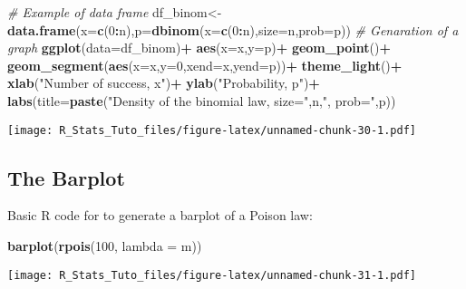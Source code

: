 \documentclass[
]{article}
\newenvironment{Shaded}{\begin{snugshade}}{\end{snugshade}}
\newcommand{\AttributeTok}[1]{\textcolor[rgb]{0.13,0.29,0.53}{#1}}
\newcommand{\CommentTok}[1]{\textcolor[rgb]{0.56,0.35,0.01}{\textit{#1}}}
\newcommand{\DecValTok}[1]{\textcolor[rgb]{0.00,0.00,0.81}{#1}}
\newcommand{\FunctionTok}[1]{\textcolor[rgb]{0.13,0.29,0.53}{\textbf{#1}}}
\newcommand{\NormalTok}[1]{#1}
\newcommand{\OtherTok}[1]{\textcolor[rgb]{0.56,0.35,0.01}{#1}}
\newcommand{\SpecialCharTok}[1]{\textcolor[rgb]{0.81,0.36,0.00}{\textbf{#1}}}
\newcommand{\StringTok}[1]{\textcolor[rgb]{0.31,0.60,0.02}{#1}}
\begin{document}
\begin{Shaded}
\begin{Highlighting}[]
\CommentTok{\# Example of data frame}
\NormalTok{df\_binom}\OtherTok{\textless{}{-}}\FunctionTok{data.frame}\NormalTok{(}\AttributeTok{x=}\FunctionTok{c}\NormalTok{(}\DecValTok{0}\SpecialCharTok{:}\NormalTok{n),}\AttributeTok{p=}\FunctionTok{dbinom}\NormalTok{(}\AttributeTok{x=}\FunctionTok{c}\NormalTok{(}\DecValTok{0}\SpecialCharTok{:}\NormalTok{n),}\AttributeTok{size=}\NormalTok{n,}\AttributeTok{prob=}\NormalTok{p))}
\CommentTok{\# Genaration of a graph}
\FunctionTok{ggplot}\NormalTok{(}\AttributeTok{data=}\NormalTok{df\_binom)}\SpecialCharTok{+}
  \FunctionTok{aes}\NormalTok{(}\AttributeTok{x=}\NormalTok{x,}\AttributeTok{y=}\NormalTok{p)}\SpecialCharTok{+}
  \FunctionTok{geom\_point}\NormalTok{()}\SpecialCharTok{+}
  \FunctionTok{geom\_segment}\NormalTok{(}\FunctionTok{aes}\NormalTok{(}\AttributeTok{x=}\NormalTok{x,}\AttributeTok{y=}\DecValTok{0}\NormalTok{,}\AttributeTok{xend=}\NormalTok{x,}\AttributeTok{yend=}\NormalTok{p))}\SpecialCharTok{+}
  \FunctionTok{theme\_light}\NormalTok{()}\SpecialCharTok{+}
  \FunctionTok{xlab}\NormalTok{(}\StringTok{"Number of success, x"}\NormalTok{)}\SpecialCharTok{+}
  \FunctionTok{ylab}\NormalTok{(}\StringTok{"Probability, p"}\NormalTok{)}\SpecialCharTok{+}
  \FunctionTok{labs}\NormalTok{(}\AttributeTok{title=}\FunctionTok{paste}\NormalTok{(}\StringTok{"Density of the binomial law, size="}\NormalTok{,n,}\StringTok{", prob="}\NormalTok{,p))}
\end{Highlighting}
\end{Shaded}

\texttt{[image: R\_Stats\_Tuto\_files/figure-latex/unnamed-chunk-30-1.pdf]}

\hypertarget{the-barplot}{%
\subsection{The Barplot}\label{the-barplot}}

Basic R code for to generate a barplot of a Poison law:

\begin{Shaded}
\begin{Highlighting}[]
\FunctionTok{barplot}\NormalTok{(}\FunctionTok{rpois}\NormalTok{(}\DecValTok{100}\NormalTok{, }\AttributeTok{lambda =}\NormalTok{ m))}
\end{Highlighting}
\end{Shaded}

\texttt{[image: R\_Stats\_Tuto\_files/figure-latex/unnamed-chunk-31-1.pdf]}
\end{document}
